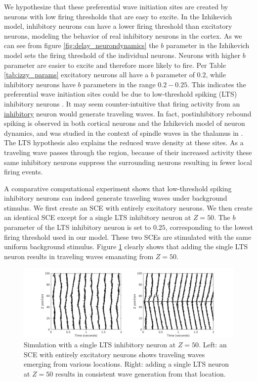 We hypothesize that these preferential wave initiation sites are created by neurons with low firing thresholds that are easy to excite.
In the Izhikevich model, inhibitory neurons can have a lower firing threshold than excitatory neurons, modeling the behavior of real inhibitory neurons in the cortex\citet{gibson2009}\citet{hayut2011}.
As we can see from figure \ref{fig:delay_neurondynamics}  the $b$ parameter in the Izhikevich model sets the firing threshold of the individual neurons.
Neurons with higher $b$ parameter are easier to excite and therefore more likely to fire.
Per Table \ref{tab:izzy_params} excitatory neurons all have a $b$ parameter of $0.2$, while inhibitory neurons have $b$ parameters in the range $0.2-0.25$.
This indicates the preferential wave initiation sites could be due to low-threshold spiking (LTS) inhibitory neurons \citet{izhikevich2003}.
It may seem counter-intuitive that firing activity from an \underline{inhibitory} neuron would generate traveling waves.
In fact, postinhibitory rebound spiking is observed in both cortical neurons \citet{ascoli2010} and the Izhikevich model of neuron dynamics,  and was studied in the context of spindle waves in the thalamus in \citet{Golomb1996}.
The LTS hypothesis also explains the reduced wave density at these sites.
As a traveling wave passes through the region, because of their increased activity these same inhibitory neurons suppress the surrounding neurons resulting in fewer local firing events.

A comparative computational experiment shows that low-threshold spiking inhibitory neurons can indeed generate traveling waves under background stimulus.
We first create an SCE with entirely excitatory neurons.
We then create an identical SCE except for a single LTS inhibitory neuron at $Z=50$.
The $b$ parameter of the LTS inhibitory neuron is set to $0.25$, corresponding to the lowest firing threshold used in our model.
These two SCEs are stimulated with the same uniform background stimulus. 
Figure \ref{fig:lts_inhibit} clearly shows that adding the single LTS neuron results in traveling waves emanating from $Z=50$. 
\begin{figure}[!htb]
 \centering
   \includegraphics[width=\textwidth]{fig/SingleLTSInhibit}
   \caption{Simulation with a single LTS inhibitory neuron at $Z=50$. 
	  Left: an SCE with entirely excitatory neurons shows traveling waves emerging from various locations. 
	  Right: adding a single LTS neuron at $Z=50$ results in consistent wave generation from that location. }
   \label{fig:lts_inhibit}
\end{figure}


